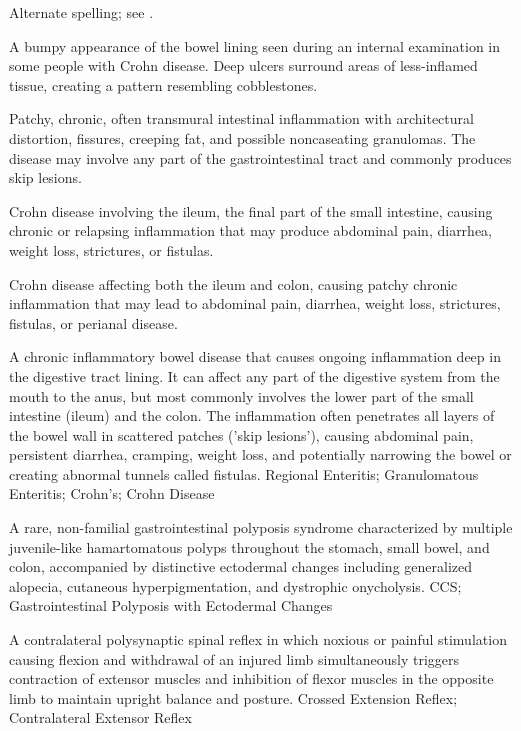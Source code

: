  Alternate spelling; see .

 A bumpy appearance of the bowel lining seen during an internal examination in some people with Crohn disease. Deep ulcers surround areas of less-inflamed tissue, creating a pattern resembling cobblestones.

 Patchy, chronic, often transmural intestinal inflammation with architectural distortion, fissures, creeping fat, and possible noncaseating granulomas. The disease may involve any part of the gastrointestinal tract and commonly produces skip lesions.

 Crohn disease involving the ileum, the final part of the small intestine, causing chronic or relapsing inflammation that may produce abdominal pain, diarrhea, weight loss, strictures, or fistulas.

 Crohn disease affecting both the ileum and colon, causing patchy chronic inflammation that may lead to abdominal pain, diarrhea, weight loss, strictures, fistulas, or perianal disease.

 A chronic inflammatory bowel disease that causes ongoing inflammation deep in the digestive tract lining. It can affect any part of the digestive system from the mouth to the anus, but most commonly involves the lower part of the small intestine (ileum) and the colon. The inflammation often penetrates all layers of the bowel wall in scattered patches ('skip lesions'), causing abdominal pain, persistent diarrhea, cramping, weight loss, and potentially narrowing the bowel or creating abnormal tunnels called fistulas.
\synonyms
Regional Enteritis; Granulomatous Enteritis; Crohn's; Crohn Disease

 A rare, non-familial gastrointestinal polyposis syndrome characterized by multiple juvenile-like hamartomatous polyps throughout the stomach, small bowel, and colon, accompanied by distinctive ectodermal changes including generalized alopecia, cutaneous hyperpigmentation, and dystrophic onycholysis.
\synonyms
CCS; Gastrointestinal Polyposis with Ectodermal Changes

 A contralateral polysynaptic spinal reflex in which noxious or painful stimulation causing flexion and withdrawal of an injured limb simultaneously triggers contraction of extensor muscles and inhibition of flexor muscles in the opposite limb to maintain upright balance and posture.
\synonyms
Crossed Extension Reflex; Contralateral Extensor Reflex

